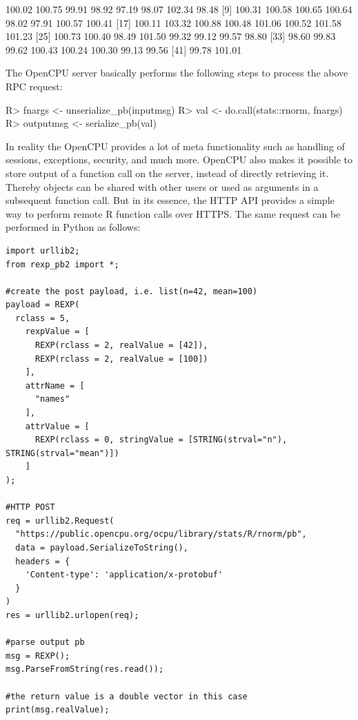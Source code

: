 \documentclass[article]{jss}
\begin{document}
\begin{Schunk}
\begin{Soutput}
 [1] 100.02 100.75  99.91  98.92  97.19  98.07 102.34  98.48
 [9] 100.31 100.58 100.65 100.64  98.02  97.91 100.57 100.41
[17] 100.11 103.32 100.88 100.48 101.06 100.52 101.58 101.23
[25] 100.73 100.40  98.49 101.50  99.32  99.12  99.57  98.80
[33]  98.60  99.83  99.62 100.43 100.24 100.30  99.13  99.56
[41]  99.78 101.01
\end{Soutput}
\end{Schunk}
The OpenCPU server basically performs the following steps to process the above RPC request:  

\begin{Schunk}
\begin{Sinput}
R> fnargs <- unserialize_pb(inputmsg)
R> val <- do.call(stats::rnorm, fnargs)
R> outputmsg <- serialize_pb(val)
\end{Sinput}
\end{Schunk}
In reality the OpenCPU provides a lot of meta functionality such as handling
of sessions, exceptions, security, and much more. OpenCPU also makes it possible to store
output of a function call on the server, instead of directly retrieving it. Thereby 
objects can be shared with other users or used as arguments in a subsequent
function call. But in its essence, the HTTP API provides a simple way to perform remote 
R function calls over HTTPS. The same request can be performed in Python as follows:

\begin{verbatim}
import urllib2;
from rexp_pb2 import *;

#create the post payload, i.e. list(n=42, mean=100)
payload = REXP(
  rclass = 5,
    rexpValue = [
      REXP(rclass = 2, realValue = [42]), 
      REXP(rclass = 2, realValue = [100])
    ],
    attrName = [
      "names"
    ],
    attrValue = [
      REXP(rclass = 0, stringValue = [STRING(strval="n"), STRING(strval="mean")])
    ]
);

#HTTP POST
req = urllib2.Request(
  "https://public.opencpu.org/ocpu/library/stats/R/rnorm/pb", 
  data = payload.SerializeToString(), 
  headers = {
    'Content-type': 'application/x-protobuf'
  }
)
res = urllib2.urlopen(req);
        
#parse output pb
msg = REXP();
msg.ParseFromString(res.read());

#the return value is a double vector in this case
print(msg.realValue);
\end{verbatim}
\end{document}
